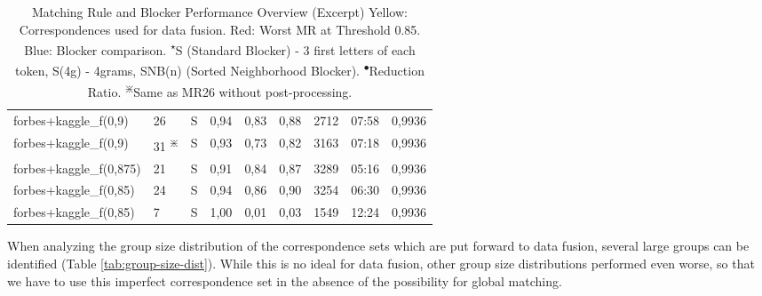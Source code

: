 \documentclass[11pt,titlepage,oneside,openany]{article}
\begin{document}
\begin{table}[]
\begin{tabular}{llcllllll}
		\rowcolor[HTML]{FFFFCC} 
		forbes+kaggle\_f(0,9)    & 26 & S        & 0,94 & 0,83 & 0,88 & 2712 & 07:58 & 0,9936 \\
		\rowcolor[HTML]{E7E6E6} 
		forbes+kaggle\_f(0,9)    & 31 \textsuperscript{$\divideontimes$} & S        & 0,93 & 0,73 & 0,82 & 3163 & 07:18 & 0,9936 \\
		forbes+kaggle\_f(0,875)  & 21 & S        & 0,91 & 0,84 & 0,87 & 3289 & 05:16 & 0,9936 \\
		forbes+kaggle\_f(0,85)   & 24 & S        & 0,94 & 0,86 & 0,90 & 3254 & 06:30 & 0,9936 \\
		\rowcolor[HTML]{FCCCC8} 
		forbes+kaggle\_f(0,85)   & 7  & S        & 1,00 & 0,01 & 0,03 & 1549 & 12:24 & 0,9936                       
	\end{tabular}
\caption[Matching Rule and Blocker Performance Overview (Excerpt)]{Matching Rule and Blocker Performance Overview (Excerpt) \medspace\small Yellow: Correspondences used for data fusion. Red: Worst MR at Threshold 0.85. Blue: Blocker comparison. \textsuperscript{$\star$}S (Standard Blocker) - 3 first letters of each token, S(4g) - 4grams, SNB(n) (Sorted Neighborhood Blocker). \textsuperscript{$\bullet$}Reduction Ratio. \textsuperscript{$\divideontimes$}Same as MR26 without post-processing.}
\label{tab:mr-performance}

\end{table}
When analyzing the group size distribution of the correspondence sets which are put forward to data fusion, several large groups can be identified (Table \ref{tab:group-size-dist}). While this is no ideal for data fusion, other group size distributions performed even worse, so that we have to use this imperfect correspondence set in the absence of the possibility for global matching.
\end{document}
